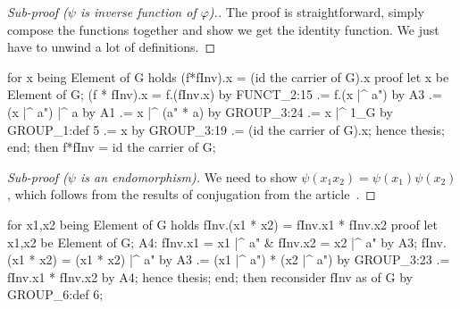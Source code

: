 \begin{proof}[Sub-proof ($\psi$ is inverse function of $\varphi$).]
The proof is straightforward, simply compose the functions together and
show we get the identity function. We just have to unwind a lot of
definitions.
\end{proof}

\nwenddocs{}\endmoddef\nwstartdeflinemarkup{}\nwenddeflinemarkup
for x being Element of G holds (f*fInv).x = (id the carrier of G).x
proof
  let x be Element of G;
  (f * fInv).x = f.(fInv.x) by FUNCT_2:15
              .= f.(x |^ a") by A3
              .= (x |^ a") |^ a by A1
              .= x |^ (a" * a) by GROUP_3:24
              .= x |^ 1_G by GROUP_1:def 5
              .= x by GROUP_3:19
              .= (id the carrier of G).x;
  hence thesis;
end;
then f*fInv = id the carrier of G;
\nwendcode{}\nwdocspar

\begin{proof}[Sub-proof ($\psi$ is an endomorphism)]
We need to show $\psi(x_{1}x_{2})=\psi(x_{1})\psi(x_{2})$, which follows
from the results of conjugation from the article~.
\end{proof}

\nwenddocs{}\endmoddef\nwstartdeflinemarkup{}\nwenddeflinemarkup
for x1,x2 being Element of G holds fInv.(x1 * x2) = fInv.x1 * fInv.x2
proof
  let x1,x2 be Element of G;
  A4: fInv.x1 = x1 |^ a" & fInv.x2 = x2 |^ a" by A3;
  fInv.(x1 * x2) = (x1 * x2) |^ a" by A3
                .= (x1 |^ a") * (x2 |^ a") by GROUP_3:23
                .= fInv.x1 * fInv.x2 by A4;
  hence thesis;
end;
then reconsider fInv as  of G by GROUP_6:def 6;
\nwendcode{}\nwdocspar

